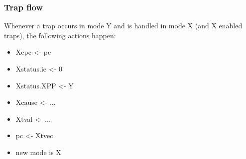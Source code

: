 \documentclass[10pt, a4paper]{article}
\begin{document}
\subsubsection{Trap flow}

Whenever a trap occurs in mode Y and is handled in mode X (and X enabled traps), the following actions happen:
\begin{itemize}
\item Xepc <- pc
\item Xstatus.ie <- 0
\item Xstatus.XPP <- Y
\item Xcause <- ...
\item Xtval <- ... 
\item pc <- Xtvec
\item new mode is X
\end{itemize}
\end{document}
